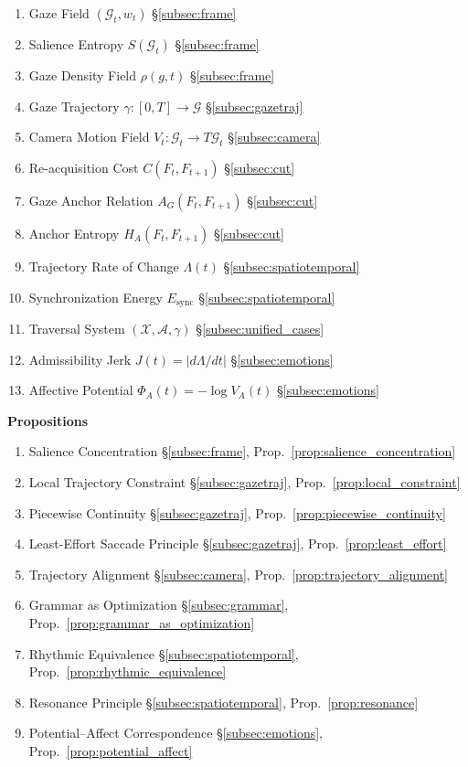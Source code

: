 \documentclass[12pt, a4paper]{article}
\theoremstyle{plain}
\theoremstyle{definition}
\theoremstyle{remark}
\newcommand{\X}{\mathcal{X}}
\newcommand{\A}{\mathcal{A}}
\newcommand{\G}{\mathcal{G}}
\newcommand{\traj}{\gamma}
\newcommand{\AG}{A_G}
\newcommand{\salience}{w}
\newcommand{\jerk}{J}
\begin{document}
\begin{enumerate}[label=D\arabic*.]
  \item Gaze Field $(\G_t, \salience_t)$
    \hfill \S\ref{subsec:frame}
  \item Salience Entropy $S(\G_t)$
    \hfill \S\ref{subsec:frame}
  \item Gaze Density Field $\rho(g,t)$
    \hfill \S\ref{subsec:frame}
  \item Gaze Trajectory $\traj : [0,T] \to \G$
    \hfill \S\ref{subsec:gazetraj}
  \item Camera Motion Field $V_t : \G_t \to T\G_t$
    \hfill \S\ref{subsec:camera}
  \item Re-acquisition Cost $C(F_t, F_{t+1})$
    \hfill \S\ref{subsec:cut}
  \item Gaze Anchor Relation $\AG(F_t, F_{t+1})$
    \hfill \S\ref{subsec:cut}
  \item Anchor Entropy $H_A(F_t, F_{t+1})$
    \hfill \S\ref{subsec:cut}
  \item Trajectory Rate of Change $\Lambda(t)$
    \hfill \S\ref{subsec:spatiotemporal}
  \item Synchronization Energy $E_{\mathrm{sync}}$
    \hfill \S\ref{subsec:spatiotemporal}
  \item Traversal System $(\X, \A, \traj)$
    \hfill \S\ref{subsec:unified_cases}
  \item Admissibility Jerk $\jerk(t) = |d\Lambda/dt|$
    \hfill \S\ref{subsec:emotions}
  \item Affective Potential $\Phi_A(t) = -\log V_A(t)$
    \hfill \S\ref{subsec:emotions}
\end{enumerate}

\medskip\noindent\textbf{Propositions}

\begin{enumerate}[label=P\arabic*.]
  \item Salience Concentration
    \hfill \S\ref{subsec:frame},
    Prop.~\ref{prop:salience_concentration}
  \item Local Trajectory Constraint
    \hfill \S\ref{subsec:gazetraj},
    Prop.~\ref{prop:local_constraint}
  \item Piecewise Continuity
    \hfill \S\ref{subsec:gazetraj},
    Prop.~\ref{prop:piecewise_continuity}
  \item Least-Effort Saccade Principle
    \hfill \S\ref{subsec:gazetraj},
    Prop.~\ref{prop:least_effort}
  \item Trajectory Alignment
    \hfill \S\ref{subsec:camera},
    Prop.~\ref{prop:trajectory_alignment}
  \item Grammar as Optimization
    \hfill \S\ref{subsec:grammar},
    Prop.~\ref{prop:grammar_as_optimization}
  \item Rhythmic Equivalence
    \hfill \S\ref{subsec:spatiotemporal},
    Prop.~\ref{prop:rhythmic_equivalence}
  \item Resonance Principle
    \hfill \S\ref{subsec:spatiotemporal},
    Prop.~\ref{prop:resonance}
  \item Potential--Affect Correspondence
    \hfill \S\ref{subsec:emotions},
    Prop.~\ref{prop:potential_affect}
\end{enumerate}
\end{document}
